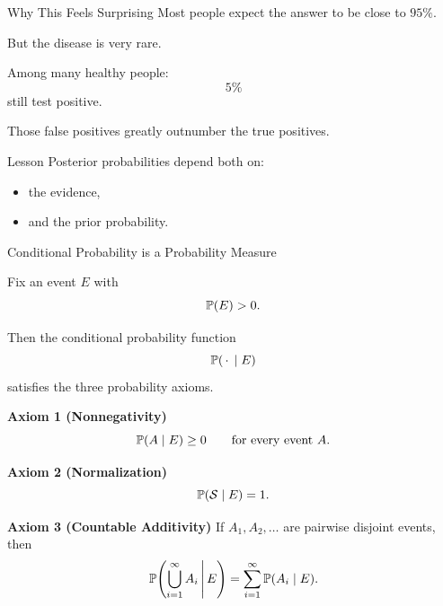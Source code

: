 \begin{frame}{Why This Feels Surprising}
Most people expect the answer to be close to $95\%$.

\vspace{0.25cm}

But the disease is very rare.

\vspace{0.25cm}

Among many healthy people:
\[
5\%
\]
still test positive.

\vspace{0.25cm}

Those false positives greatly outnumber the true positives.

\vspace{0.25cm}

\begin{keybox}{Lesson}
Posterior probabilities depend both on:
\begin{itemize}
    \item the evidence,
    \item and the prior probability.
\end{itemize}
\end{keybox}
\end{frame}

\begin{frame}{Conditional Probability is a Probability Measure}

Fix an event $E$ with
\[
\mathbb{P}(E)>0.
\]

Then the conditional probability function
\[
\mathbb{P}(\,\cdot\,\mid E)
\]
satisfies the three probability axioms.

\vspace{0.3cm}

\textbf{Axiom 1 (Nonnegativity)}
\[
\mathbb{P}(A\mid E)\ge 0
\qquad\text{for every event }A.
\]

\vspace{0.15cm}

\textbf{Axiom 2 (Normalization)}
\[
\mathbb{P}(\mathcal{S}\mid E)=1.
\]

\vspace{0.15cm}

\textbf{Axiom 3 (Countable Additivity)}
If $A_1,A_2,\ldots$ are pairwise disjoint events, then
\[
\mathbb{P}\!\left(\bigcup_{i=1}^{\infty}A_i\,\middle|\,E\right)
=
\sum_{i=1}^{\infty}\mathbb{P}(A_i\mid E).
\]

\end{frame}

